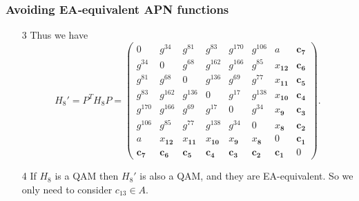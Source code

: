 \documentclass[
    aspectratio=169,                   %
]{beamer}
\begin{document}
    \begin{frame}
        \frametitle{Avoiding EA‑equivalent APN functions}
        \begin{example}
            \begin{enumerate}
                \item[3] Thus we have \[ H_8'=P^TH_8P=\left(\begin{array}{cccccccc}
                    0 & g^{34} & g^{81} & g^{83} & g^{170} & g^{106} & a & \mathbf{c}_{\mathbf{7}} \\
                    g^{34} & 0 & g^{68} & g^{162} & g^{166} & g^{85} & x_{\mathbf{1 2}} & \mathbf{c}_{\mathbf{6}} \\
                    g^{81} & g^{68} & 0 & g^{136} & g^{69} & g^{77} & x_{\mathbf{1 1}} & \mathbf{c}_{\mathbf{5}} \\
                    g^{83} & g^{162} & g^{136} & 0 & g^{17} & g^{138} & x_{\mathbf{1 0}} & \mathbf{c}_{\mathbf{4}} \\
                    g^{170} & g^{166} & g^{69} & g^{17} & 0 & g^{34} & x_{\mathbf{9}} & \mathbf{c}_{\mathbf{3}} \\
                    g^{106} & g^{85} & g^{77} & g^{138} & g^{34} & 0 & x_{\mathbf{8}} & \mathbf{c}_{\mathbf{2}} \\
                    a & x_{\mathbf{1 2}} & x_{\mathbf{1 1}} & x_{\mathbf{1 0}} & x_{\mathbf{9}} & x_{\mathbf{8}} & 0 & \mathbf{c}_{\mathbf{1}} \\
                    \mathbf{c}_{\mathbf{7}} & \mathbf{c}_{\mathbf{6}} & \mathbf{c}_{\mathbf{5}} & \mathbf{c}_{\mathbf{4}} & \mathbf{c}_{\mathbf{3}} & \mathbf{c}_{\mathbf{2}} & \mathbf{c}_{\mathbf{1}} & 0
                \end{array}\right). \]
                \item[4] If $ H_8 $ is a QAM then $ H_8' $ is also a QAM, and they are EA-equivalent. So we only need
                to consider $ c_{13}\in A $.
            \end{enumerate}
        \end{example}
        
    \end{frame}
\end{document}
